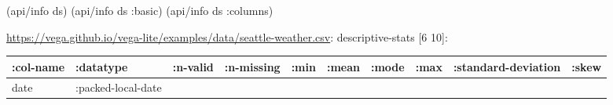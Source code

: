 \documentclass[]{article}
\newenvironment{Shaded}{\begin{snugshade}}{\end{snugshade}}
\newcommand{\AttributeTok}[1]{\textcolor[rgb]{0.77,0.63,0.00}{#1}}
\newcommand{\NormalTok}[1]{#1}
\begin{document}
\begin{Shaded}
\begin{Highlighting}[]
\NormalTok{(api/info ds)}
\NormalTok{(api/info ds }\AttributeTok{:basic}\NormalTok{)}
\NormalTok{(api/info ds }\AttributeTok{:columns}\NormalTok{)}
\end{Highlighting}
\end{Shaded}

\url{https://vega.github.io/vega-lite/examples/data/seattle-weather.csv}:
descriptive-stats {[}6 10{]}:

\begin{longtable}[]{@{}llllllllll@{}}
\toprule
\begin{minipage}[b]{0.08\columnwidth}\raggedright
:col-name\strut
\end{minipage} & \begin{minipage}[b]{0.11\columnwidth}\raggedright
:datatype\strut
\end{minipage} & \begin{minipage}[b]{0.05\columnwidth}\raggedright
:n-valid\strut
\end{minipage} & \begin{minipage}[b]{0.06\columnwidth}\raggedright
:n-missing\strut
\end{minipage} & \begin{minipage}[b]{0.06\columnwidth}\raggedright
:min\strut
\end{minipage} & \begin{minipage}[b]{0.06\columnwidth}\raggedright
:mean\strut
\end{minipage} & \begin{minipage}[b]{0.04\columnwidth}\raggedright
:mode\strut
\end{minipage} & \begin{minipage}[b]{0.06\columnwidth}\raggedright
:max\strut
\end{minipage} & \begin{minipage}[b]{0.11\columnwidth}\raggedright
:standard-deviation\strut
\end{minipage} & \begin{minipage}[b]{0.09\columnwidth}\raggedright
:skew\strut
\end{minipage}\tabularnewline
\midrule
\endhead
\begin{minipage}[t]{0.08\columnwidth}\raggedright
date\strut
\end{minipage} & \begin{minipage}[t]{0.11\columnwidth}\raggedright
:packed-local-date\strut
\end{minipage} & \begin{minipage}[t]{0.05\columnwidth}\raggedright

\end{minipage}
\end{longtable}
\end{document}

